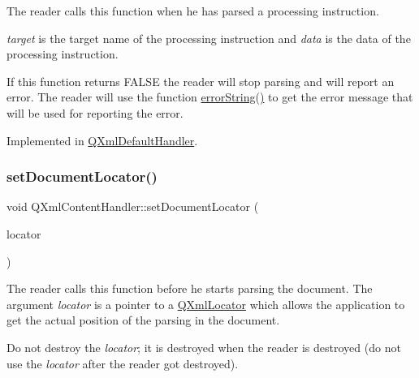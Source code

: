 The reader calls this function when he has parsed a processing instruction.

{\itshape target} is the target name of the processing instruction and {\itshape data} is the data of the processing instruction.

If this function returns F\+A\+L\+SE the reader will stop parsing and will report an error. The reader will use the function \mbox{\hyperlink{class_q_xml_content_handler_adba96547bad1cf1b009dbfb7b7c571be}{error\+String()}} to get the error message that will be used for reporting the error. 

Implemented in \mbox{\hyperlink{class_q_xml_default_handler_afd9bbe78b71f7787e22a3a7555ddba59}{Q\+Xml\+Default\+Handler}}.

\mbox{\label{class_q_xml_content_handler_a89863bd9a6372d3d73086aa99107bca7}} 
\subsubsection{\texorpdfstring{setDocumentLocator()}{setDocumentLocator()}}
{\footnotesize\ttfamily void Q\+Xml\+Content\+Handler\+::set\+Document\+Locator (\begin{DoxyParamCaption}\item[{\mbox{\hyperlink{class_q_xml_locator}{Q\+Xml\+Locator}} $\ast$}]{locator }\end{DoxyParamCaption})\hspace{0.3cm}{\ttfamily [pure virtual]}}

The reader calls this function before he starts parsing the document. The argument {\itshape locator} is a pointer to a \mbox{\hyperlink{class_q_xml_locator}{Q\+Xml\+Locator}} which allows the application to get the actual position of the parsing in the document.

Do not destroy the {\itshape locator}; it is destroyed when the reader is destroyed (do not use the {\itshape locator} after the reader got destroyed). 

